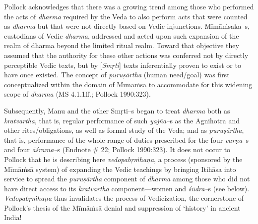 Pollock acknowledges that there was a growing trend among those who performed the acts of \textit{dharma} required by the Veda to also perform acts that were counted as \textit{dharma} but that were not directly based on Vedic injunctions. Mīmāṁsaka–s, custodians of Vedic \textit{dharma}, addressed and acted upon such expansion of the realm of dharma beyond the limited ritual realm. Toward that objective they assumed that the authority for these other actions was conferred not by directly perceptible Vedic texts, but by [\textit{Smṛti}] texts inferentially proven to exist or to have once existed. The concept of \textit{puruṣārtha} (human need/goal) was first conceptualized within the domain of Mīmāṁsā to accommodate for this widening scope of \textit{dharma} (MS 4.1.1ff.; Pollock 1990:323).

Subsequently, Manu and the other Smṛti–s began to treat \textit{dharma} both as \textit{kratvartha}, that is, regular performance of such \textit{yajña–}s as the Agnihotra and other rites/obligations, as well as formal study of the Veda; and as \textit{puruṣārtha}, that is, performance of the whole range of duties prescribed for the four \textit{varṇa–}s and four \textit{āśrama–}s (Endnote \# 22; Pollock 1990:323). It does not occur to Pollock that he is describing here \textit{vedopabṛṁhaṇa}, a process (sponsored by the Mīmāṁsā system) of expanding the Vedic teachings by bringing Itihāsa into service to spread the \textit{puruṣārtha} component of \textit{dharma} among those who did not have direct access to its \textit{kratvartha} component—women and \textit{śūdra–}s (see below). \textit{Vedopabṛṁhaṇa} thus invalidates the process of Vedicization, the cornerstone of Pollock’s thesis of the Mīmāṁsā denial and suppression of ‘history’ in ancient India! 

